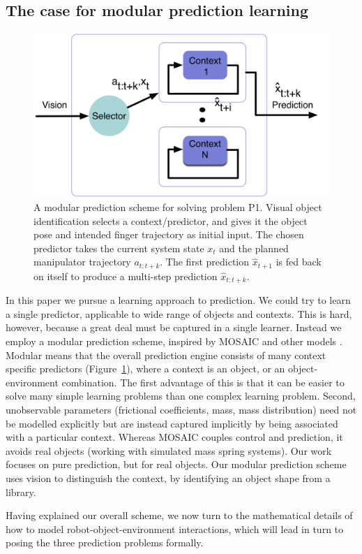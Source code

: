 \subsection{The case for modular prediction learning}
\begin{figure}[t]
\centerline{\includegraphics[width=0.9\columnwidth]{modular-schema}}
\caption{A modular prediction scheme for solving problem P1. Visual object identification selects a context/predictor, and gives it the object pose and intended finger trajectory as initial input. The chosen predictor takes the current system state $x_t$ and the planned manipulator trajectory $a_{t:t+k}$. The first prediction $\hat{x}_{t+1}$ is fed back on itself to produce a multi-step prediction $\hat{x}_{t:t+k}$. \label{fig:modular-simple}}
\end{figure}
In this paper we pursue a learning approach to prediction. We could try to learn a single predictor, applicable to wide range of objects and contexts. This is hard, however, because a great deal must be captured in a single learner. Instead we employ a modular prediction scheme, inspired by MOSAIC \citep{Haruno_MOSAIC_2008} and other models \citep{demiris2003distributed}. Modular means that the overall prediction engine consists of many context specific predictors (Figure~\ref{fig:modular-simple}), where a context is an object, or an object-environment combination. The first advantage of this is that it can be easier to solve many simple learning problems than one complex learning problem. Second, unobservable parameters (frictional coefficients, mass, mass distribution) need not be modelled explicitly but are instead captured implicitly by being associated with a particular context. Whereas MOSAIC couples control and prediction, it avoids real objects (working with simulated mass spring systems). Our work focuses on pure prediction, but for real objects. Our modular prediction scheme uses vision to distinguish the context, by identifying an object shape from a library.

Having explained our overall scheme, we now turn to the mathematical details of how to model robot-object-environment interactions, which will lead in turn to posing the three prediction problems formally.